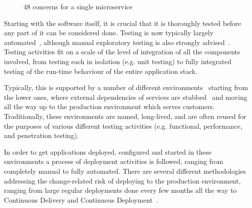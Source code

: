 \documentclass[reprint,amsmath,amssymb,aps]{revtex4-1}
\begin{document}
\begin{figure}[b]
	\setlength{\fboxsep}{1em}
	\caption{48 concerns for a single microservice~\cite{Treadway17:online}}
	\label{fig:concerns}
\end{figure}

Starting with the software itself, it is crucial that it is thoroughly tested before any part of it can be considered done. Testing is now typically largely automated~\cite{TestPyra22:online}, although manual exploratory testing is also strongly advised~\cite{Explorat86:online}. Testing activities fit on a scale of the level of integration of all the components involved, from testing each in isolation (e.g. unit testing) to fully integrated testing of the run-time behaviour of the entire application stack.

Typically, this is supported by a number of different environments~\cite{Professi40:online} starting from the lower ones, where external dependencies of services are stubbed~\cite{TestStub82:online} and moving all the way up to the production environment which serves customers. Traditionally, these environments are named, long-lived, and are often reused for the purposes of various different testing activities (e.g. functional, performance, and penetration testing).

In order to get applications deployed, configured and started in these environments a process of deployment activities is followed, ranging from completely manual to fully automated. There are several different methodologies addressing the change-related risk of deploying to the production environment, ranging from large regular deployments done every few months all the way to Continuous Delivery and Continuous Deployment~\cite{WhatisCo44:online}.
\end{document}
